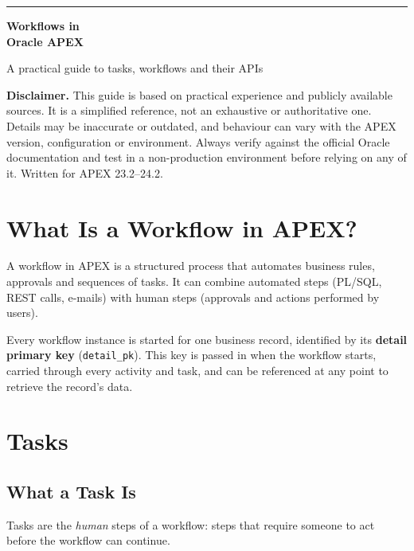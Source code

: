\documentclass[11pt,a4paper]{article}
\begin{document}
\begin{titlepage}
\vspace*{4cm}
{\sffamily\color{accent}\rule{2.5cm}{3pt}\par}
\vspace{0.8em}
{\sffamily\fontsize{30}{36}\selectfont\bfseries Workflows in\\[0.2em] Oracle APEX\par}
\vspace{1em}
{\sffamily\Large A practical guide to tasks, workflows and their APIs\par}
\vspace{3cm}
\begin{tcolorbox}[enhanced,colback=codebg,colframe=codebg,arc=0pt,left=10pt,right=10pt,top=8pt,bottom=8pt]
\small\textbf{\sffamily Disclaimer.} This guide is based on practical experience and publicly available sources. It is a simplified reference, not an exhaustive or authoritative one. Details may be inaccurate or outdated, and behaviour can vary with the APEX version, configuration or environment. Always verify against the official Oracle documentation and test in a non-production environment before relying on any of it. Written for APEX 23.2--24.2.
\end{tcolorbox}
\vfill
\end{titlepage}

\tableofcontents
\newpage

\section{What Is a Workflow in APEX?}
A workflow in APEX is a structured process that automates business rules, approvals and sequences of tasks. It can combine automated steps (PL/SQL, REST calls, e-mails) with human steps (approvals and actions performed by users).

Every workflow instance is started for one business record, identified by its \textbf{detail primary key} (\texttt{detail\_pk}). This key is passed in when the workflow starts, carried through every activity and task, and can be referenced at any point to retrieve the record's data.

\section{Tasks}
\subsection{What a Task Is}
Tasks are the \emph{human} steps of a workflow: steps that require someone to act before the workflow can continue.
\end{document}
